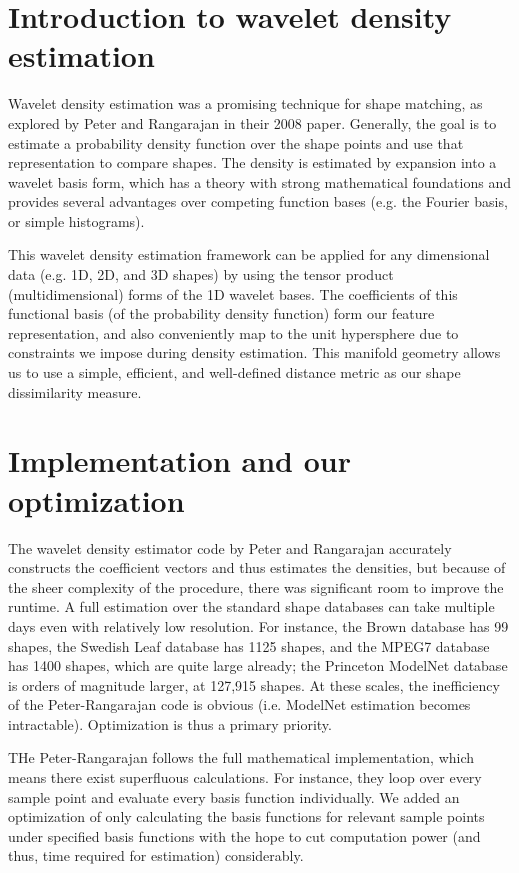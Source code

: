 \documentclass[../tech_report_1.tex]{subfiles}
\begin{document}
\section{Introduction to wavelet density estimation}

Wavelet density estimation was a promising technique for shape matching, as explored by Peter and Rangarajan in their 2008 paper\cite{peter2008maximum}. Generally, the goal is to estimate a probability density function over the shape points and use that representation to compare shapes. The density is estimated by expansion into a wavelet basis form, which has a theory with strong mathematical foundations and provides several advantages over competing function bases (e.g. the Fourier basis, or simple histograms). 

This wavelet density estimation framework can be applied for any dimensional data (e.g. 1D, 2D, and 3D shapes) by using the tensor product (multidimensional) forms of the 1D wavelet bases. The coefficients of this functional basis (of the probability density function) form our feature representation, and also conveniently map to the unit hypersphere due to constraints we impose during density estimation. This manifold geometry allows us to use a simple, efficient, and well-defined distance metric as our shape dissimilarity measure.

\section{Implementation and our optimization}

The wavelet density estimator code by Peter and Rangarajan accurately constructs the coefficient vectors and thus estimates the densities, but because of the sheer complexity of the procedure, there was significant room to improve the runtime. A full estimation over the standard shape databases can take multiple days even with relatively low resolution.
For instance, the Brown database has 99 shapes, the Swedish Leaf database has 1125 shapes, and the MPEG7 database has 1400 shapes, which are quite large already; the Princeton ModelNet database is orders of magnitude larger, at 127,915 shapes. At these scales, the inefficiency of the Peter-Rangarajan code is obvious (i.e. ModelNet estimation becomes intractable). Optimization is thus a primary priority.

THe Peter-Rangarajan follows the full mathematical implementation, which means there exist superfluous calculations. For instance, they loop over every sample point and evaluate every basis function individually. We added an optimization of only calculating the basis functions
for relevant sample points under specified basis functions with the
hope to cut computation power (and thus, time required for estimation) considerably.
\end{document}
